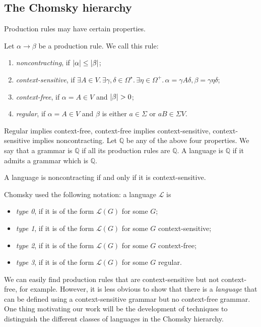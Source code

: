 \subsection{The Chomsky hierarchy}
Production rules may have certain properties.
\begin{definition}
	Let \( \alpha \to \beta \) be a production rule.
	We call this rule:
	\begin{enumerate}
		\item \emph{noncontracting}, if \( \abs{\alpha} \leq \abs{\beta} \);
		\item \emph{context-sensitive}, if \( \exists A \in V.\, \exists \gamma,\delta \in \Omega^\star.\, \exists \eta \in \Omega^+.\, \alpha = \gamma A \delta, \beta = \gamma \eta \delta \);
		\item \emph{context-free}, if \( \alpha = A \in V \) and \( \abs{\beta} > 0 \);
		\item \emph{regular}, if \( \alpha = A \in V \) and \( \beta \) is either \( a \in \Sigma \) or \( aB \in \Sigma V \).
	\end{enumerate}
	Regular implies context-free, context-free implies context-sensitive, context-sensitive implies noncontracting.
	Let \( \mathbb Q \) be any of the above four properties.
	We say that a grammar is \( \mathbb Q \) if all its production rules are \( \mathbb Q \).
	A language is \( \mathbb Q \) if it admits a grammar which is \( \mathbb Q \).
\end{definition}
\begin{theorem}[Chomsky]
	A language is noncontracting if and only if it is context-sensitive.
\end{theorem}
Chomsky used the following notation: a language \( \mathcal L \) is
\begin{itemize}
	\item \emph{type 0}, if it is of the form \( \mathcal L(G) \) for some \( G \);
	\item \emph{type 1}, if it is of the form \( \mathcal L(G) \) for some \( G \) context-sensitive;
	\item \emph{type 2}, if it is of the form \( \mathcal L(G) \) for some \( G \) context-free;
	\item \emph{type 3}, if it is of the form \( \mathcal L(G) \) for some \( G \) regular.
\end{itemize}
We can easily find production rules that are context-sensitive but not context-free, for example.
However, it is less obvious to show that there is a \emph{language} that can be defined using a context-sensitive grammar but no context-free grammar.
One thing motivating our work will be the development of techniques to distinguish the different classes of languages in the Chomsky hierarchy.
